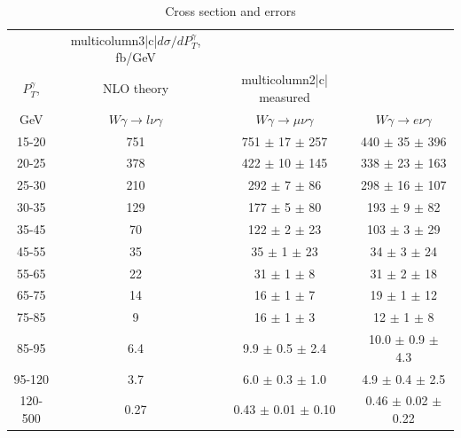 \begin{table}[h]
  \scriptsize
  \begin{center}
  \caption{Cross section and errors}
  \begin{tabular}{|c|c|c|c|}
                     & multicolumn{3}{|c|}{$d\sigma/dP_{T}^{\gamma}$, fb/GeV} \\ 
     $P_T^{\gamma}$, & NLO theory                          &  multicolumn{2}{|c|}   measured      \\
    GeV              &  $W\gamma\rightarrow l\nu\gamma$ & $W\gamma\rightarrow \mu\nu\gamma$  & $W\gamma\rightarrow e\nu\gamma$    \\ \hline
    15-20 & 751 & 751 $\pm$ 17 $\pm$ 257 & 440 $\pm$ 35 $\pm$ 396\\ \hline
    20-25 & 378 & 422 $\pm$ 10 $\pm$ 145 & 338 $\pm$ 23 $\pm$ 163\\ \hline
    25-30 & 210 & 292 $\pm$ 7 $\pm$ 86 & 298 $\pm$ 16 $\pm$ 107\\ \hline
    30-35 & 129 & 177 $\pm$ 5 $\pm$ 80  & 193 $\pm$ 9 $\pm$ 82\\ \hline
    35-45 & 70 & 122 $\pm$ 2 $\pm$ 23 & 103 $\pm$ 3 $\pm$ 29\\ \hline
    45-55 & 35 & 35 $\pm$ 1 $\pm$ 23 & 34 $\pm$ 3 $\pm$ 24\\ \hline
    55-65 & 22 & 31 $\pm$ 1 $\pm$ 8  & 31 $\pm$ 2 $\pm$ 18\\ \hline
    65-75 & 14 & 16 $\pm$ 1 $\pm$ 7 & 19 $\pm$ 1 $\pm$ 12 \\ \hline
    75-85 & 9 & 16 $\pm$ 1 $\pm$ 3 & 12 $\pm$ 1 $\pm$ 8\\ \hline
    85-95 & 6.4 & 9.9 $\pm$ 0.5 $\pm$ 2.4 & 10.0 $\pm$ 0.9 $\pm$ 4.3\\ \hline
    95-120 & 3.7 & 6.0 $\pm$ 0.3 $\pm$ 1.0 & 4.9 $\pm$ 0.4 $\pm$ 2.5\\ \hline
    120-500 & 0.27 & 0.43 $\pm$ 0.01 $\pm$ 0.10 & 0.46 $\pm$ 0.02 $\pm$ 0.22\\ \hline
  \end{tabular}
  \label{tab:cs_mc_vs_meas_WGamma}
  \end{center}
\end{table}
 
